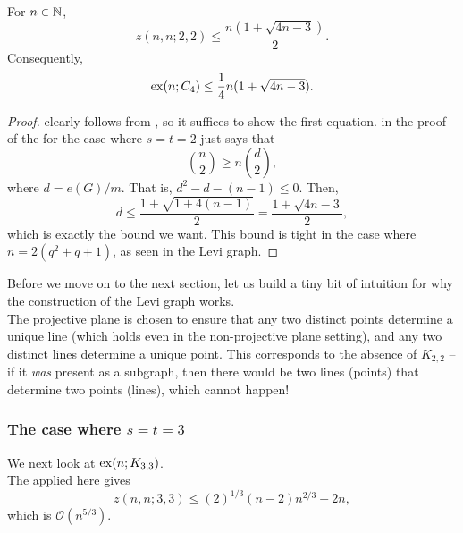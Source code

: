 			\begin{corollary}
				\label{theo: levi graph optimality}
				For $n\in\mathbb{N}$,
				\begin{equation}
					\label{eqn: z n n 2 2}
					z(n,n;2,2) \le \frac{n (1 + \sqrt{4n-3})}{2}.
				\end{equation}
				Consequently,
				\begin{equation}
					\label{eqn: exx n C4}
					\operatorname{ex}(n;C_4) \le \frac{1}{4} n (1 + \sqrt{4n-3}).
				\end{equation}
			\end{corollary}
			\begin{proof}
				 clearly follows from , so it suffices to show the first equation.  in the proof of the  for the case where $s=t=2$ just says that
				\[ \binom{n}{2} \ge n \binom{d}{2}, \]
				where $d = e(G)/m$. That is, $d^2 - d - (n-1) \le 0$. Then,
				\[ d \le \frac{1 + \sqrt{1 + 4(n-1)}}{2} = \frac{1 + \sqrt{4n-3}}{2}, \]
				which is exactly the bound we want. This bound is tight in the case where $n = 2(q^2+q+1)$, as seen in the Levi graph.
			\end{proof}

			Before we move on to the next section, let us build a tiny bit of intuition for why the construction of the Levi graph works.\\
			The projective plane is chosen to ensure that any two distinct points determine a unique line (which holds even in the non-projective plane setting), and any two distinct lines determine a unique point. This corresponds to the absence of $K_{2,2}$ -- if it \emph{was} present as a subgraph, then there would be two lines (points) that determine two points (lines), which cannot happen!

		\subsubsection{The case where \texorpdfstring{$s=t=3$}{s=t=3}}

			We next look at $\operatorname{ex}(n;K_{3,3})$.\\

			The  applied here gives
			\[ z(n,n;3,3) \le (2)^{1/3} (n-2)n^{2/3} + 2n, \]
			which is $\mathcal{O}(n^{5/3})$.

